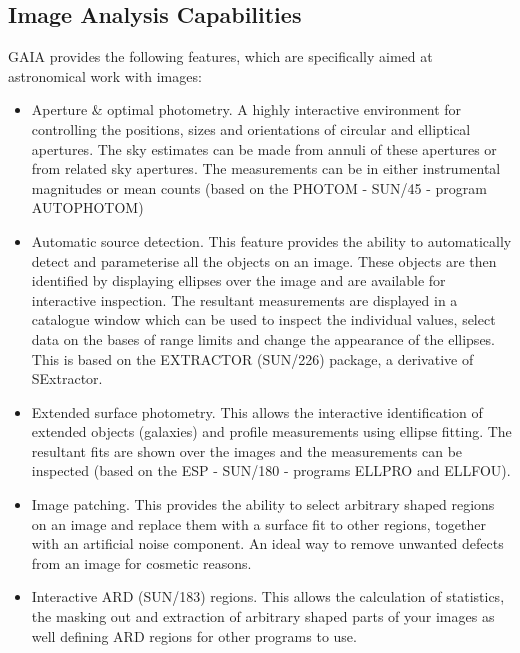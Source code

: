 \documentclass[twoside,11pt]{article}
\newcommand{\xref}[3]{#1}
\newcommand{\xlabel}[1]{}
\renewcommand{\_}{\texttt{\symbol{95}}}
\begin{document}
\subsection{\xlabel{image_analysis_capabilities}Image Analysis Capabilities}
GAIA provides the following features, which are specifically aimed at
astronomical work with images:
\begin{itemize}
\item Aperture \& optimal photometry. A highly interactive environment
  for controlling the positions, sizes and orientations of circular
  and elliptical apertures. The sky estimates can be made from
  annuli of these apertures or from related sky apertures. The
  measurements can be in either instrumental magnitudes or
  mean counts (based on the PHOTOM - \xref{SUN/45}{sun45}{} -
  program \xref{AUTOPHOTOM}{sun45}{AUTOPHOTOM})

\item Automatic source detection. This feature provides the ability to
  automatically detect and parameterise all the objects on an
  image. These objects are then identified by displaying ellipses over
  the image and are available for interactive inspection. The resultant
  measurements are displayed in a catalogue window which can be used to
  inspect the individual values, select data on the bases of range
  limits and change the appearance of the ellipses. This is based on the
  EXTRACTOR (\xref{SUN/226}{sun226}{}) package, a derivative of
  SExtractor.

\item Extended surface photometry. This allows the interactive
  identification of extended objects (galaxies) and profile
  measurements using ellipse fitting. The resultant fits are shown
  over the images and the measurements can be inspected (based on the
  ESP - \xref{SUN/180}{sun180}{} - programs
  \xref{ELLPRO}{sun180}{ELLPRO} and \xref{ELLFOU}{sun180}{ELLFOU}).

\item Image patching. This provides the ability to select arbitrary
  shaped regions on an image and replace them with a surface fit
  to other regions, together with an artificial noise component.
  An ideal way to remove unwanted defects from an image for
  cosmetic reasons.

\item Interactive ARD (\xref{SUN/183}{sun183}{}) regions. This
  allows the calculation of statistics, the masking out and
  extraction of arbitrary shaped parts of your images as well
  defining ARD regions for other programs to use.


\end{itemize}
\end{document}
